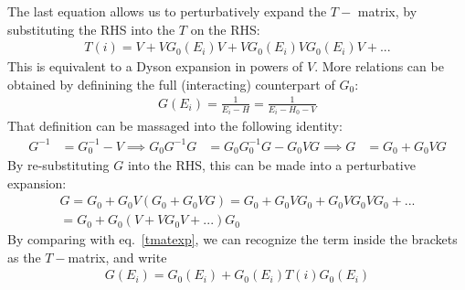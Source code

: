 The last equation allows us to perturbatively expand the \(T-\) matrix, by substituting the RHS into the \(T\) on the RHS:
\begin{equation}\begin{aligned}
T(i) = V + VG_0(E_i)V + VG_0(E_i)VG_0(E_i)V + ...
\label{tmatexp}
\end{aligned}\end{equation}
This is equivalent to a Dyson expansion in powers of \(V\). More relations can be obtained by definining the full (interacting) counterpart of \(G_0\):
\begin{equation}\begin{aligned}
	G(E_i) = \frac{1}{E_i - H} = \frac{1}{E_i - H_0 - V}
\end{aligned}\end{equation}
That definition can be massaged into the following identity:
\begin{equation}\begin{aligned}
	\label{GinVG}
	G^{-1} &= G_0^{-1} - V \implies G_0 G^{-1} G &= G_0 G_0^{-1} G - G_0 V G \implies G &= G_0 + G_0 V G
\end{aligned}\end{equation}
By re-substituting \(G\) into the RHS, this can be made into a perturbative expansion:
\begin{equation}\begin{aligned}
	G = G_0 + G_0 V \left(G_0 + G_0 V G\right) = G_0 + G_0 V G_0 + G_0 V G_0 V G_0 + ... \\
	= G_0 + G_0 \left( V + V G_0 V + ... \right) G_0
\end{aligned}\end{equation}
By comparing with eq.~\ref{tmatexp}, we can recognize the term inside the brackets as the \(T-\)matrix, and write
\begin{equation}\begin{aligned}
	G(E_i) = G_0(E_i) + G_0(E_i) T(i) G_0(E_i)
	\label{G_and_G0}
\end{aligned}\end{equation}

